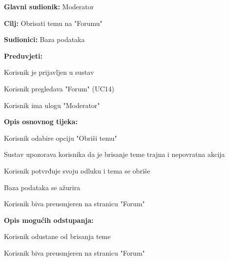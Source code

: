 					\noindent {}
					\begin{packed_item}
	
						\item \textbf{Glavni sudionik: }Moderator
						\item  \textbf{Cilj:} Obrisati temu na "Forumu"
						\item  \textbf{Sudionici:} Baza podataka
						\item  \textbf{Preduvjeti:}
						\item[] \begin{packed_enum}
							\item Korisnik je prijavljen u sustav
							\item Korisnik pregledava "Forum" (UC14)
							\item Korisnik ima ulogu "Moderator"
						\end{packed_enum}
						\item  \textbf{Opis osnovnog tijeka:}
						
						\item[] \begin{packed_enum}
	
							\item Korisnik odabire opciju "Obriši temu"
							\item Sustav upozorava korisnika da je brisanje teme trajna i nepovratna akcija
							\item Korisnik potvrđuje svoju odluku i tema se obriše
							\item Baza podataka se ažurira
							\item Korisnik biva preusmjeren na stranicu "Forum"
						\end{packed_enum}
						
						\item  \textbf{Opis mogućih odstupanja:}
						
						\item[] \begin{packed_item}
	
							\item[3.a] Korisnik odustane od brisanja teme
							\item[] \begin{packed_enum}
								
								\item Korisnik biva preusmjeren na stranicu "Forum"
								
							\end{packed_enum}
							
						\end{packed_item}
					\end{packed_item}
					
